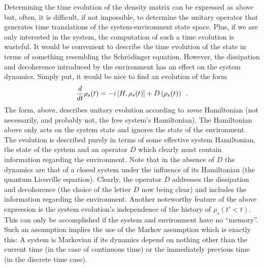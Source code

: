 \documentclass{article}
\begin{document}
Determining the time evolution of the density matrix can be expressed as above
but, often, it is difficult, if not impossible, to determine the unitary
operator that generates time translations of the system-environment state space.
Plus, if we are only interested in the system, the computation of such a time
evolution is wasteful. It would be convenient to describe the time evolution of
the state in terms of something resembling the Schr\"{o}dinger equation.
However, the dissipation and decoherence introduced by the environment has an
effect on the system dynamics. Simply put, it would be nice to find an evolution
of the form
\begin{equation}
   \frac{d}{dt}\rho_{s}(t) = -i \left[ H, \rho_{s}(t) \right] + D \left(
   \rho_{s}(t) \right) \enskip.
\end{equation}
The form, above, describes unitary evolution according to \textit{some}
Hamiltonian (not necessarily, and probably not, the free system's Hamiltonian).
The Hamiltonian above only acts on the system state and ignores the state of the
environment. The evolution is described purely in terms of some effective system
Hamiltonian, the state of the system and an operator $ D $ which clearly must
contain information regarding the environment. Note that in the absence of $ D $
the dynamics are that of a closed system under the influence of its Hamiltonian
(the quantum Liouville equation). Clearly, the operator $ D $ addresses the
dissipation and decohorence (the choice of the letter $ D $ now being clear) and
includes the information regarding the environment. Another noteworthy feature
of the above expression is the system evolution's independence of the history of
$ \rho_{s}(t' < t) $. This can only be accomplished if the system and
environment have no ``memory''. Such an assumption implies the use of the Markov
assumption which is exactly this: A system is Markovian if its dynamics depend
on nothing other than the current time (in the case of continuous time) or the
immediately previous time (in the discrete time case).
\end{document}
